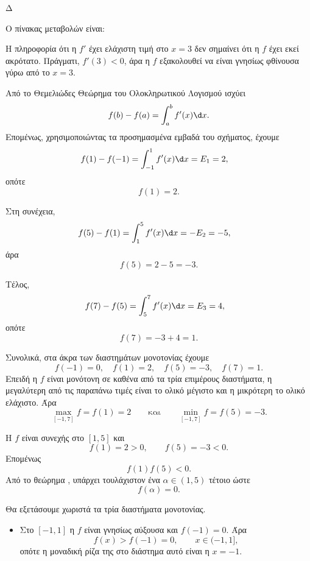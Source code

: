 \begin{thema}{Δ}
\begin{erwthma}
Ο πίνακας μεταβολών είναι:
\begin{center}
\end{center}

Η πληροφορία ότι η $f'$ έχει ελάχιστη τιμή στο $x=3$ δεν σημαίνει ότι
η $f$ έχει εκεί ακρότατο. Πράγματι, $f'(3)<0$, άρα η $f$ εξακολουθεί
να είναι γνησίως φθίνουσα γύρω από το $x=3$.

\item Από το Θεμελιώδες Θεώρημα του Ολοκληρωτικού Λογισμού ισχύει
\[
f(b)-f(a)=\int_a^b f'(x)\d x.
\]
Επομένως, χρησιμοποιώντας τα προσημασμένα εμβαδά του σχήματος, έχουμε
\begin{align*}
f(1)-f(-1)
&=\int_{-1}^{1}f'(x)\d x
=E_1=2,
\end{align*}
οπότε
\[
{f(1)=2}.
\]

Στη συνέχεια,
\begin{align*}
f(5)-f(1)
&=\int_{1}^{5}f'(x)\d x
=-E_2=-5,
\end{align*}
άρα
\[
{f(5)=2-5=-3}.
\]

Τέλος,
\begin{align*}
f(7)-f(5)
&=\int_{5}^{7}f'(x)\d x
=E_3=4,
\end{align*}
οπότε
\[
{f(7)=-3+4=1}.
\]

Συνολικά, στα άκρα των διαστημάτων μονοτονίας έχουμε
\[
{f(-1)=0,\quad f(1)=2,\quad f(5)=-3,\quad f(7)=1}.
\]
Επειδή η $f$ είναι μονότονη σε καθένα από τα τρία επιμέρους διαστήματα,
η μεγαλύτερη από τις παραπάνω τιμές είναι το ολικό μέγιστο και η
μικρότερη το ολικό ελάχιστο. Άρα
\[
{\max_{[-1,7]}f=f(1)=2}
\qquad\text{και}\qquad
{\min_{[-1,7]}f=f(5)=-3}.
\]

\item Η $f$ είναι συνεχής στο $[1,5]$ και
\[
f(1)=2>0,\qquad f(5)=-3<0.
\]
Επομένως
\[
f(1)f(5)<0.
\]
Από το θεώρημα , υπάρχει τουλάχιστον ένα
$\alpha\in(1,5)$ τέτοιο ώστε
\[
{f(\alpha)=0}.
\]

\item Θα εξετάσουμε χωριστά τα τρία διαστήματα μονοτονίας.
\begin{itemize}
\item Στο $[-1,1]$ η $f$ είναι γνησίως αύξουσα και $f(-1)=0$. Άρα
\[
f(x)>f(-1)=0,\qquad x\in(-1,1],
\]
οπότε η μοναδική ρίζα της στο διάστημα αυτό είναι η $x=-1$.


\end{itemize}
\end{erwthma}
\end{thema}
